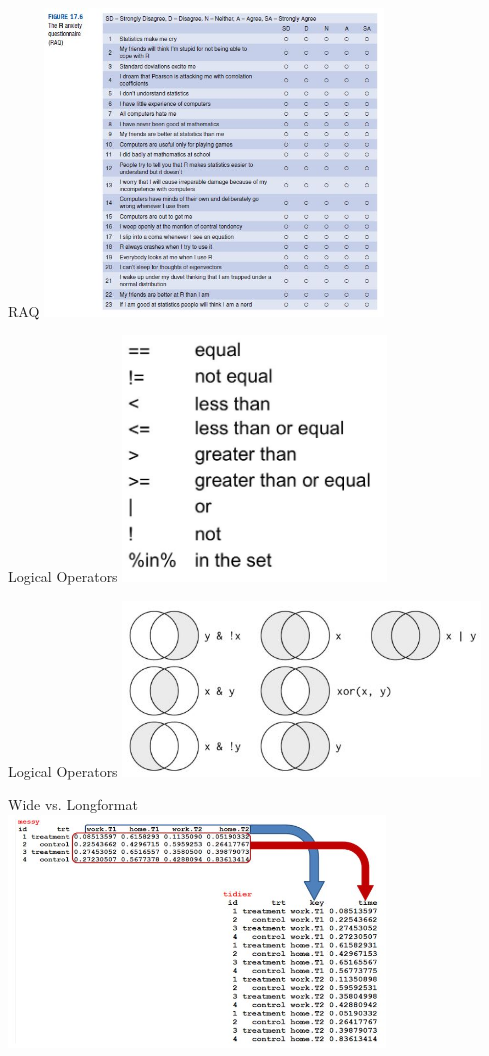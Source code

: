 \documentclass{beamer}
\begin{document}
\begin{frame}{RAQ}
\includegraphics[width = 9cm]{RAQ_R_anxiety_quest.JPG}
\end{frame}

\begin{frame}{Logical Operators}
    \includegraphics[width = 7cm]{lo.JPG}
\end{frame}

\begin{frame}{Logical Operators}
    \includegraphics[width = 9.5cm]{lo2.JPG}
\end{frame}

\begin{frame}{Wide vs. Longformat}
\includegraphics[width = 10cm]{gather.JPG}
\end{frame}
\end{document}
